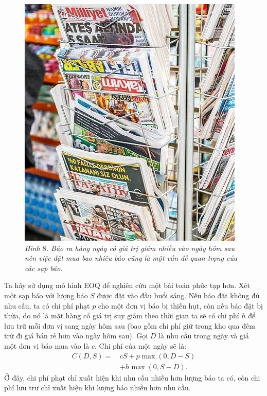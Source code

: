 \begin{multicols}{2}
\begin{figure}[H]
		\includegraphics[width= 1\linewidth]{9}
		\caption{\small\textit{\color{toanhocdoisong}Hình $8$. Báo ra hàng ngày có giá trị giảm nhiều vào ngày hôm sau nên việc đặt mua bao nhiêu báo cũng là một vấn đề quan trọng của các sạp báo.}}
		\vspace*{-10pt}
	\end{figure}
	Ta hãy sử dụng mô hình EOQ để nghiên cứu một bài toán phức tạp hơn. Xét một sạp báo với lượng báo $S$ được đặt vào đầu buổi sáng. Nếu báo đặt không đủ nhu cầu, ta có chi phí phạt $p$ cho một đơn vị báo bị thiếu hụt, còn nếu báo đặt bị thừa, do nó là mặt hàng có giá trị suy giảm theo thời gian ta sẽ có chi phí $h$ để lưu trữ mỗi đơn vị sang ngày hôm sau (bao gồm chi phí giữ trong kho qua đêm trừ đi giá bán rẻ hơn vào ngày hôm sau).
	\vskip 0.1cm
	Gọi $D$ là nhu cầu trong ngày và giá một đơn vị báo mua vào là $c$. Chi phí của một ngày sẽ là:
	\begin{align*}
		C(D,S) = \,&cS + p\max(0,D - S) \\
		&+ h\max(0,S-D).
	\end{align*}
	Ở đây, chi phí phạt chỉ xuất hiện khi nhu cầu nhiều hơn lượng báo ta có, còn chi phí lưu trữ chỉ xuất hiện khi lượng báo nhiều hơn nhu cầu.

\end{multicols}
